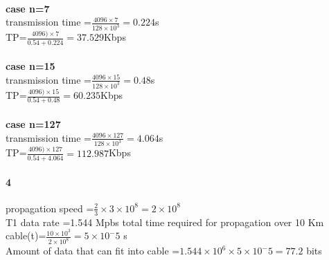 \documentclass[24 pts]{article}
\begin{document}
\paragraph{}
\textbf{case n=7}\\
transmission time =$\frac{4096\times 7}{128\times 10^3}= 0.224$s\\
TP=$\frac{4096)\times 7}{0.54+0.224}=37.529$Kbps\\

\paragraph{}
\textbf{case n=15}\\
transmission time =$\frac{4096\times 15}{128\times 10^3}= 0.48$s\\
TP=$\frac{4096)\times 15}{0.54+0.48}=60.235$Kbps\\

\paragraph{}
\textbf{case n=127}\\
transmission time =$\frac{4096\times 127}{128\times 10^3}= 4.064$s\\
TP=$\frac{4096)\times 127}{0.54+4.064}=112.987$Kbps\\




\newpage
\paragraph{4}
propagation speed =$\frac{2}{3}\times 3\times 10^8 = 2 \times 10^8$\\
T1 data rate =1.544 Mpbs
total time required for propagation over 10 Km cable(t)=$\frac{10\times10^3}{2 \times 10^8} = 5\times 10^-5$ s\\
Amount of data that can fit into cable =$1.544\times 10^6 \times 5\times 10^-5 = 77.2$ bits
\end{document}
